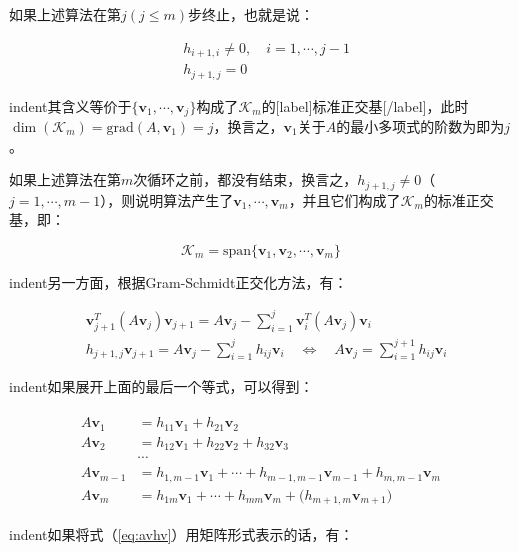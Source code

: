 \documentclass[UTF8,nofonts]{ctexart}
\begin{document}
如果上述算法在第$j(j \leq m)$步终止，也就是说：

\begin{eqnarray*}
& h_{i+1,i} \neq 0,\quad i=1,\cdots,j-1 \\
& h_{j+1,j}=0
\end{eqnarray*}

indent其含义等价于$\{\boldsymbol{v}_1,\cdots,\boldsymbol{v}_j\}$构成了$\mathcal{K}_m$的[label]标准正交基[/label]，此时$\dim(\mathcal{K}_m)=\text{grad}  (A,\boldsymbol{v}_1)=j$，换言之，$\boldsymbol{v}_1$关于$A$的最小多项式的阶数为即为$j$。

如果上述算法在第$m$次循环之前，都没有结束，换言之，$h_{j+1,j} \neq 0$（$j=1,\cdots,m-1$），则说明算法产生了$\boldsymbol{v}_1,\cdots,\boldsymbol{v}_m$，并且它们构成了$\mathcal{K}_m$的标准正交基，即：

\[\mathcal{K}_m=\text{span}\{\boldsymbol{v}_1,\boldsymbol{v}_2,\cdots,\boldsymbol{v}_m\}\]

indent另一方面，根据Gram-Schmidt正交化方法，有：

\begin{eqnarray*}
& \displaystyle\boldsymbol{v}_{j+1}^T(A\boldsymbol{v}_j)\boldsymbol{v}_{j+1}=A\boldsymbol{v}_j-\sum_{i=1}^j\boldsymbol{v}_i^T(A\boldsymbol{v}_j)\boldsymbol{v}_i \\
& \displaystyle h_{j+1,j}\boldsymbol{v}_{j+1}=A\boldsymbol{v}_j-\sum_{i=1
}^jh_{ij}\boldsymbol{v}_i\quad\Longleftrightarrow\quad A\boldsymbol{v}_j=\sum_{i=1}^{j+1}h_{ij}\boldsymbol{v}_i
\end{eqnarray*}

indent如果展开上面的最后一个等式，可以得到：

\begin{align}
\label{eq:avhv}
\begin{split}
A\boldsymbol{v}_1 &= h_{11}\boldsymbol{v}_1+h_{21}\boldsymbol{v}_2 \\
A\boldsymbol{v}_2 &= h_{12}\boldsymbol{v}_1+h_{22}\boldsymbol{v}_2+h_{32}\boldsymbol{v}_3 \\
&\cdots \\
A\boldsymbol{v}_{m-1} &= h_{1,m-1}\boldsymbol{v}_1+\cdots+h_{m-1,m-1}\boldsymbol{v}_{m-1}+h_{m,m-1}\boldsymbol{v}_m \\
A\boldsymbol{v}_{m} &= h_{1m}\boldsymbol{v}_1+\cdots+h_{mm}\boldsymbol{v}_m+\big(h_{m+1,m}\boldsymbol{v}_{m+1}\big)
\end{split}
\end{align}

indent如果将式（\ref{eq:avhv}）用矩阵形式表示的话，有：
\end{document}
